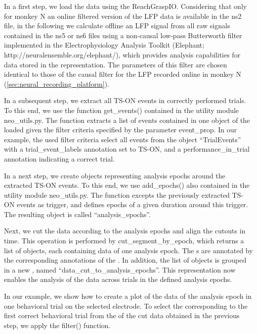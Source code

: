 {In a first step, we load the data using the ReachGraspIO. Considering that only for monkey N an online filtered version of the LFP data is available in the ns2 file, in the following we calculate offline an LFP signal from all raw signals contained in the ns5 or ns6 files using a non-causal low-pass Butterworth filter implemented in the Electrophysiology Analysis Toolkit (Elephant; http://neuralensemble.org/elephant/), which provides analysis capabilities for data stored in the  representation. The parameters of this filter are chosen identical to those of the causal filter for the LFP recorded online in monkey N (\cref{sec:neural_recording_platform}).

In a subsequent step, we extract all TS-ON events in correctly performed trials. To this end, we use the function get\_events() contained in the utility module neo\_utils.py. The function extracts a list of events contained in one  object of the loaded   given the filter criteria specified by the parameter event\_prop. In our example, the used filter criteria select all events from the  object “TrialEvents” with a trial\_event\_labels annotation set to TS-ON, and a performance\_in\_trial annotation indicating a correct trial.

In a next step, we create  objects representing analysis epochs around the extracted TS-ON events. To this end, we use add\_epochs() also contained in the utility module neo\_utils.py. The function excepts the previously extracted TS-ON events as trigger, and defines epochs of a given duration around this trigger. The resulting  object is called “analysis\_epochs”. 

Next, we cut the data according to the analysis epochs and align the cutouts in time. This operation is performed by cut\_segment\_by\_epoch, which returns a list of  objects, each containing data of one analysis epoch. The s are annotated by the corresponding annotations of the  . In addition, the list of  objects is grouped in a new  , named “data\_cut\_to\_analysis\_epochs”. This representation now enables the analysis of the data across trials in the defined analysis epochs. 

In our example, we show how to create a plot of the data of the analysis epoch in one behavioral trial on the selected electrode. To select the   corresponding to the first correct behavioral trial from the  of the cut data obtained in the previous step, we apply the  filter() function. 

}
